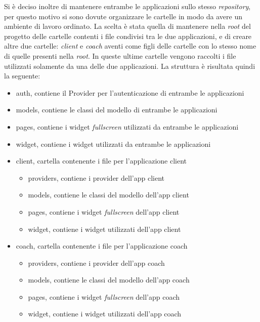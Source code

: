 Si è deciso inoltre di mantenere entrambe le applicazioni sullo stesso \textit{repository}, per questo motivo si sono dovute organizzare le cartelle in modo da avere un ambiente di lavoro ordinato. La scelta è stata quella di mantenere nella \textit{root} del progetto delle cartelle contenti i file condivisi tra le due applicazioni, e di creare altre due cartelle: \textit{client} e \textit{coach} aventi come figli delle cartelle con lo stesso nome di quelle presenti nella \textit{root}. In queste ultime cartelle vengono raccolti i file utilizzati solamente da una delle due applicazioni.
La struttura è risultata quindi la seguente:
\begin{itemize}
    \item auth, contiene il Provider per l'autenticazione di entrambe le applicazioni
    \item models, contiene le classi del modello di entrambe le applicazioni
    \item pages, contiene i widget \textit{fullscreen} utilizzati da entrambe le applicazioni
    \item widget, contiene i widget utilizzati da entrambe le applicazioni
    \item client, cartella contenente i file per l'applicazione client
    \begin{itemize}
        \item providers, contiene i provider dell'app client
        \item models, contiene le classi del modello dell'app client
        \item pages, contiene i widget \textit{fullscreen} dell'app client
        \item widget, contiene i widget utilizzati dell'app client
    \end{itemize}
    \item coach, cartella contenente i file per l'applicazione coach
    \begin{itemize}
        \item providers, contiene i provider dell'app coach
        \item models, contiene le classi del modello dell'app coach
        \item pages, contiene i widget \textit{fullscreen} dell'app coach
        \item widget, contiene i widget utilizzati dell'app coach
    \end{itemize}
\end{itemize}
